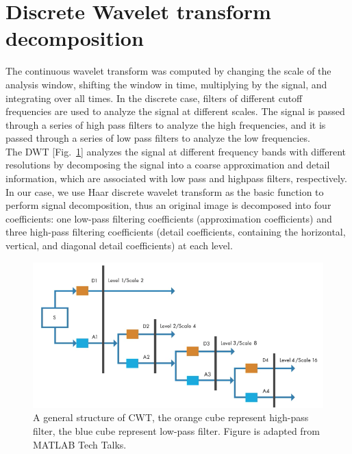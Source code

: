 \section{Discrete Wavelet transform decomposition}
The continuous wavelet transform was computed by changing the scale of the analysis window, shifting the window in time, multiplying by the signal, and integrating over all times. In the discrete case, filters of different cutoff frequencies are used to analyze the signal at different scales. The signal is passed through a series of high pass filters to analyze the high frequencies, and it is passed through a series of low pass filters to analyze the low frequencies.\\
The DWT [Fig.~\ref{fig:dwt}] analyzes the signal at different frequency bands with different resolutions by decomposing the signal into a coarse approximation and detail information, which are associated with low pass and highpass filters, respectively. In our case, we use Haar discrete wavelet transform as the basic function to perform signal decomposition, thus
an original image is decomposed into four coefficients: one low-pass filtering coefficients (approximation coefficients) and three high-pass filtering coefficients (detail
coefficients, containing the horizontal, vertical, and diagonal detail coefficients) at each level.


\begin{figure}[h]
\centering
\includegraphics[width=1\textwidth]{images/dwt.png}
\caption[Structure of CNNs]{A general structure of CWT, the orange cube represent high-pass filter, the blue cube represent low-pass filter. Figure is adapted from MATLAB Tech Talks.}
\label{fig:dwt}
\end{figure}

